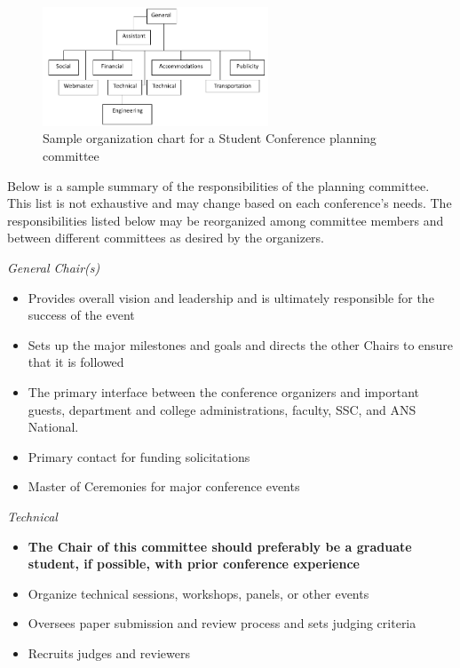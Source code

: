 \documentclass[12pt]{article}
\begin{document}
\begin{figure}[b]
    \centering
    \includegraphics[width=0.6\textwidth]{OrgChart.PNG}
    \caption{Sample organization chart for a Student Conference planning committee}
    \label{fig:OrgChart}
\end{figure}

Below is a sample summary of the responsibilities of the planning committee.
This list is not exhaustive and may change based on each conference's needs.
The responsibilities listed below may be reorganized among committee members and between different committees as desired by the organizers.

\emph{General Chair(s)}
\begin{itemize}
    \item Provides overall vision and leadership and is ultimately responsible for the success of the event
    \item Sets up the major milestones and goals and directs the other Chairs to ensure that it is followed
    \item The primary interface between the conference organizers and important guests, department and college administrations, faculty, SSC, and ANS National.
    \item Primary contact for funding solicitations
    \item Master of Ceremonies for major conference events
\end{itemize}

\emph{Technical}
\begin{itemize}
    \item \textbf{The Chair of this committee should preferably be a graduate student, if possible, with prior conference experience}
    \item Organize technical sessions, workshops, panels, or other events
    \item Oversees paper submission and review process and sets judging criteria
    \item Recruits judges and reviewers
\end{itemize}
\end{document}
